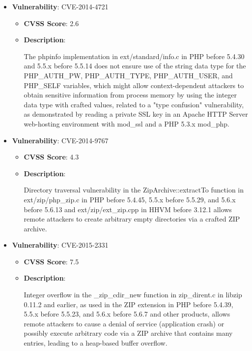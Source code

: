 \documentclass{article}
\begin{document}
\begin{itemize}
        \item \textbf{Vulnerability}: CVE-2014-4721
        \begin{itemize}
            \item \textbf{CVSS Score}:  2.6 
            \item \textbf{Description}:
            \parbox[t]{0.9\linewidth}{
                \ttfamily The phpinfo implementation in ext/standard/info.c in PHP before 5.4.30 and 5.5.x before 5.5.14 does not ensure use of the string data type for the PHP\_AUTH\_PW, PHP\_AUTH\_TYPE, PHP\_AUTH\_USER, and PHP\_SELF variables, which might allow context-dependent attackers to obtain sensitive information from process memory by using the integer data type with crafted values, related to a "type confusion" vulnerability, as demonstrated by reading a private SSL key in an Apache HTTP Server web-hosting environment with mod\_ssl and a PHP 5.3.x mod\_php.
            }
        \end{itemize}
    
        \item \textbf{Vulnerability}: CVE-2014-9767
        \begin{itemize}
            \item \textbf{CVSS Score}:  4.3 
            \item \textbf{Description}:
            \parbox[t]{0.9\linewidth}{
                \ttfamily Directory traversal vulnerability in the ZipArchive::extractTo function in ext/zip/php\_zip.c in PHP before 5.4.45, 5.5.x before 5.5.29, and 5.6.x before 5.6.13 and ext/zip/ext\_zip.cpp in HHVM before 3.12.1 allows remote attackers to create arbitrary empty directories via a crafted ZIP archive.
            }
        \end{itemize}
    
        \item \textbf{Vulnerability}: CVE-2015-2331
        \begin{itemize}
            \item \textbf{CVSS Score}:  7.5 
            \item \textbf{Description}:
            \parbox[t]{0.9\linewidth}{
                \ttfamily Integer overflow in the \_zip\_cdir\_new function in zip\_dirent.c in libzip 0.11.2 and earlier, as used in the ZIP extension in PHP before 5.4.39, 5.5.x before 5.5.23, and 5.6.x before 5.6.7 and other products, allows remote attackers to cause a denial of service (application crash) or possibly execute arbitrary code via a ZIP archive that contains many entries, leading to a heap-based buffer overflow.
            }
        \end{itemize}
    

\end{itemize}
\end{document}

